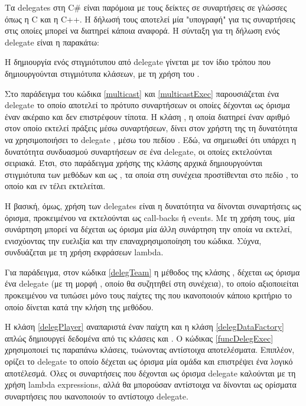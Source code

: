 Τα delegates στη C\# είναι παρόμοια με τους δείκτες σε συναρτήσεις σε γλώσσες όπως η C και η C++.  Η δήλωσή τους αποτελεί μία "υπογραφή" για τις συναρτήσεις στις οποίες μπορεί να διατηρεί κάποια αναφορά. Η σύνταξη για τη δήλωση ενός delegate είναι η παρακάτω:


Η δημιουργία ενός στιγμιότυπου από delegate γίνεται με τον ίδιο τρόπου που δημιουργούνται στιγμιότυπα κλάσεων, με τη χρήση του .

Στο παράδειγμα του κώδικα \ref{multicast} και \ref{multicastExec} παρουσιάζεται ένα delegate  το οποίο αποτελεί το πρότυπο συναρτήσεων οι οποίες δέχονται ως όρισμα έναν ακέραιο και δεν επιστρέφουν τίποτα. Η κλάση , η οποία διατηρεί έναν αριθμό στον οποίο εκτελεί πράξεις μέσω συναρτήσεων, δίνει στον χρήστη της τη δυνατότητα να χρησιμοποιήσει το delegate , μέσω του πεδίου . Εδώ, να σημειωθεί ότι υπάρχει η δυνατότητα συνδυασμού συναρτήσεων σε ένα delegate, οι οποίες εκτελούνται σειριακά. Έτσι, στο παράδειγμα χρήσης της κλάσης αρχικά δημιουργούνται στιγμιότυπα των μεθόδων  και  ως , τα οποία στη συνέχεια προστίθενται στο πεδίο , το οποίο και εν τέλει εκτελείται.




Η βασική, όμως, χρήση των delegates είναι η δυνατότητα να δίνονται συναρτήσεις ως όρισμα, προκειμένου να εκτελούνται ως call-backs ή events. Με τη χρήση τους, μία συνάρτηση μπορεί να δέχεται ως όρισμα μία άλλη συνάρτηση την οποία να εκτελεί, ενισχύοντας την ευελιξία και την επαναχρησιμοποίηση του κώδικα. Σύχνα, συνδυάζεται με τη χρήση εκφράσεων lambda.

Για παράδειγμα, στον κώδικα \ref{delegTeam} η μέθοδος  της κλάσης , δέχεται ως όρισμα ένα delegate (με τη μορφή , οποίο θα συζητηθεί στη συνέχεια), το οποίο αξιοποιείται προκειμένου να τυπώσει μόνο τους παίχτες της που ικανοποιούν κάποιο κριτήριο το οποίο δίνεται κατά την κλήση της μεθόδου.

Η κλάση \ref{delegPlayer} αναπαριστά έναν παίχτη και η κλάση \ref{delegDataFactory} απλώς δημιουργεί δεδομένα από τις κλάσεις  και . Ο κώδικας \ref{funcDelegExec} χρησιμοποιεί τις παραπάνω κλάσεις, τυώνοντας αντίστοιχα αποτελέσματα. Επιπλέον, ορίζει το delegate  το οποίο δέχεται ως όρισμα μία ομάδα και επιστρέψει ένα λογικό αποτέλεσμά. Όλες οι συναρτήσεις που δέχονται ως όρισμα delegate καλούνται με τη χρήση lambda expressions, αλλά θα μπορούσαν αντίστοιχα να δίνονται ως ορίσματα συναρτήσεις που ικανοποιούν το αντίστοιχο delegate.

